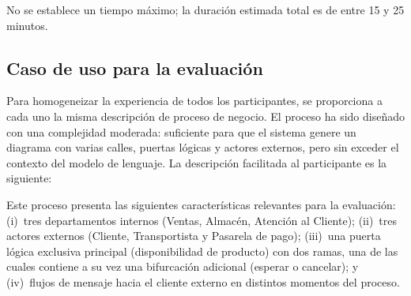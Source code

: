 No se establece un tiempo máximo; la duración estimada total es de entre 15 y 25 minutos.

\subsection{Caso de uso para la evaluación}
\label{subsec:casoUso}

Para homogeneizar la experiencia de todos los participantes, se proporciona a cada uno la misma descripción de proceso de negocio. El proceso ha sido diseñado con una complejidad moderada: suficiente para que el sistema genere un diagrama con varias calles, puertas lógicas y actores externos, pero sin exceder el contexto del modelo de lenguaje. La descripción facilitada al participante es la siguiente:

\bigskip
\noindent
\begin{center}
\setlength{\fboxsep}{12pt}
\end{center}
\bigskip

Este proceso presenta las siguientes características relevantes para la evaluación: (i)~tres departamentos internos (Ventas, Almacén, Atención al Cliente); (ii)~tres actores externos (Cliente, Transportista y Pasarela de pago); (iii)~una puerta lógica exclusiva principal (disponibilidad de producto) con dos ramas, una de las cuales contiene a su vez una bifurcación adicional (esperar o cancelar); y (iv)~flujos de mensaje hacia el cliente externo en distintos momentos del proceso.


